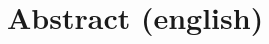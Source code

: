 \documentclass[12pt]{article}
\begin{document}

\section{Abstract (english)}

\nocite{*}


\end{document}

